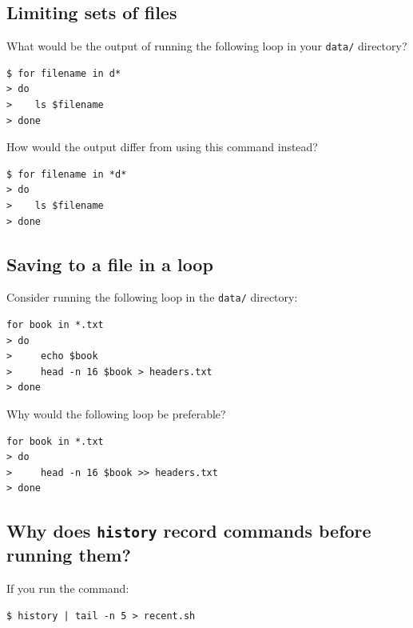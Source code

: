 \documentclass[
]{krantz}
\begin{document}
\hypertarget{bash-basics-ex-limiting-file-sets}{%
\subsection{Limiting sets of files}\label{bash-basics-ex-limiting-file-sets}}

What would be the output of running the following loop in your \texttt{data/} directory?

\begin{verbatim}
$ for filename in d*
> do
>    ls $filename
> done
\end{verbatim}

How would the output differ from using this command instead?

\begin{verbatim}
$ for filename in *d*
> do
>    ls $filename
> done
\end{verbatim}

\hypertarget{bash-basics-ex-loop-save}{%
\subsection{Saving to a file in a loop}\label{bash-basics-ex-loop-save}}

Consider running the following loop in the \texttt{data/} directory:

\begin{verbatim}
for book in *.txt
> do
>     echo $book
>     head -n 16 $book > headers.txt
> done
\end{verbatim}

Why would the following loop be preferable?

\begin{verbatim}
for book in *.txt
> do
>     head -n 16 $book >> headers.txt
> done
\end{verbatim}

\hypertarget{bash-basics-ex-history-order}{%
\subsection{\texorpdfstring{Why does \texttt{history} record commands before running them?}{Why does history record commands before running them?}}\label{bash-basics-ex-history-order}}

If you run the command:

\begin{verbatim}
$ history | tail -n 5 > recent.sh
\end{verbatim}
\end{document}
